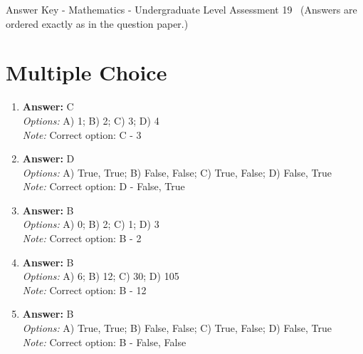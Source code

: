 \documentclass[12pt]{article}
\begin{document}
\begin{center}
Answer Key - Mathematics - Undergraduate Level Assessment 19 \
\small (Answers are ordered exactly as in the question paper.)
\end{center}

\section*{Multiple Choice}
\begin{enumerate}[label=\arabic*.]
\item \textbf{Answer:} C
\\ \textit{Options:} A) 1; B) 2; C) 3; D) 4
\\ \textit{Note:} Correct option: C - 3
\item \textbf{Answer:} D
\\ \textit{Options:} A) True, True; B) False, False; C) True, False; D) False, True
\\ \textit{Note:} Correct option: D - False, True
\item \textbf{Answer:} B
\\ \textit{Options:} A) 0; B) 2; C) 1; D) 3
\\ \textit{Note:} Correct option: B - 2
\item \textbf{Answer:} B
\\ \textit{Options:} A) 6; B) 12; C) 30; D) 105
\\ \textit{Note:} Correct option: B - 12
\item \textbf{Answer:} B
\\ \textit{Options:} A) True, True; B) False, False; C) True, False; D) False, True
\\ \textit{Note:} Correct option: B - False, False
\end{enumerate}
\end{document}
